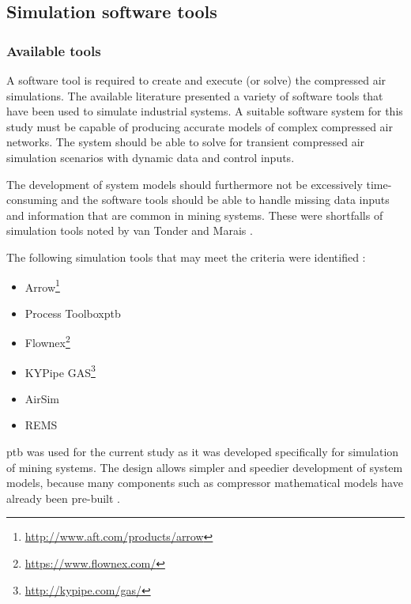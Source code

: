 \subsection{Simulation software tools}
\subsubsection{Available tools}
A software tool is required to create and execute (or solve) the compressed air simulations. The available literature presented a variety of software tools that have been used to simulate industrial systems. A suitable software system for this study must be capable of producing accurate models of complex compressed air networks. The system should be able to solve for transient compressed air simulation scenarios with dynamic data and control inputs.
\clearpage
\par 
The development of system models should furthermore not be excessively time-consuming and the software tools should be able to handle missing data inputs and information that are common in mining systems. These were shortfalls of simulation tools noted by van Tonder \cite{vanTonder2014PhD} and Marais \cite{Mare2016PhD}.
\par
The following simulation tools that may meet the criteria were identified : 
\begin{itemize}
	\item Arrow\footnote{\url{http://www.aft.com/products/arrow}}
	\item Process Toolbox\gls{ptb}
	\item Flownex\footnote{\url{https://www.flownex.com/}}
	\item KYPipe GAS\footnote{\url{http://kypipe.com/gas/}}
	\item AirSim
	\item REMS
\end{itemize}
 \gls{ptb} was used for the current study as it was developed specifically for simulation of mining systems. The design allows simpler and speedier development of system models, because many components such as compressor mathematical models have already been pre-built \cite{Mare2016PhD}. 
